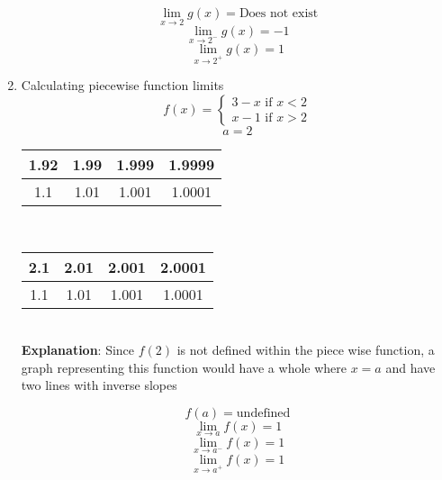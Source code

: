\documentclass{article}
\begin{document}
\begin{enumerate}
	$$\lim_{x \to 2}{g(x)} = \text{Does not exist}$$
	$$\lim_{x \to 2^-}{g(x)} = -1$$
	$$\lim_{x \to 2^+}{g(x)} = 1$$

    \item Calculating piecewise function limits
	    $$f(x) = \begin{cases}3 - x \text{ if } x < 2 \\ x - 1 \text{ if } x > 2 \end{cases}$$
	    $$a = 2$$
	  
	\begin{tabular}{| c | c | c | c |}
        \hline
	    1.92 & 1.99 & 1.999 & 1.9999 \\
        \hline
	    1.1 & 1.01 & 1.001 & 1.0001 \\
        \hline
    \end{tabular} \\
	  
	\begin{tabular}{| c | c | c | c |}
        \hline
	    2.1 & 2.01 & 2.001 & 2.0001 \\
        \hline
	    1.1 & 1.01 & 1.001 & 1.0001 \\
        \hline
    \end{tabular} \\
	  
	\textbf{Explanation}: Since $f(2)$ is not defined within the piece wise function, a graph representing this function would have a whole where $x = a$ and have two lines with inverse slopes
	      
	$$f(a) = \text{undefined}$$
	$$\lim_{x \to a}{f(x)} = 1$$
	$$\lim_{x \to a^-}{f(x)} = 1$$
	$$\lim_{x \to a^+}{f(x)} = 1$$


\end{enumerate}
\end{document}
